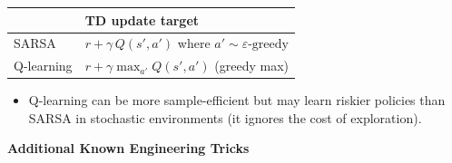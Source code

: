 \documentclass[11pt]{article}
\newcounter{none}
\providecommand{\tightlist}{%
      \setlength{\itemsep}{0pt}\setlength{\parskip}{0pt}}
\begin{document}
{\def\LTcaptype{none} %
\begin{longtable}[]{@{}
  >{\raggedright\arraybackslash}p{}
  >{\raggedright\arraybackslash}p{}@{}}
\toprule\noalign{}
\begin{minipage}[b]{\linewidth}\raggedright
\end{minipage} & \begin{minipage}[b]{\linewidth}\raggedright
TD update target
\end{minipage} \\
\midrule\noalign{}
\endhead
\bottomrule\noalign{}
\endlastfoot
SARSA & \(r + \gamma\, Q(s', a')\) where
\(a' \sim \varepsilon\text{-greedy}\) \\
Q-learning & \(r + \gamma \max_{a'} Q(s', a')\) (greedy max) \\
\end{longtable}
}

\begin{itemize}
\tightlist
\item
  Q-learning can be more sample-efficient but may learn riskier policies
  than SARSA in stochastic environments (it ignores the cost of
  exploration).
\end{itemize}

    \label{tricks-2-5}

    \textbf{Additional Known Engineering Tricks}
\end{document}
